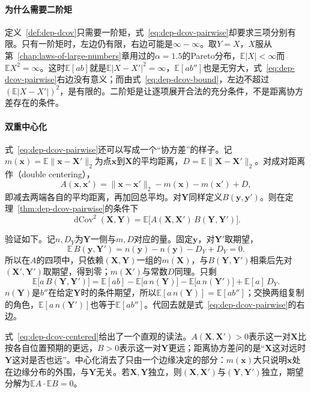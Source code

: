 \paragraph{为什么需要二阶矩}
定义~\ref{def:dep-dcov}只需要一阶矩，式~\eqref{eq:dep-dcov-pairwise}却要求三项分别有限。只有一阶矩时，左边仍有限，右边可能是$\infty-\infty$。取$Y=X$，$X$服从第~\ref{chap:laws-of-large-numbers}章用过的$\alpha=1.5$的Pareto分布，$\mathbb{E}\lvert X\rvert<\infty$而$\mathbb{E}X^{2}=\infty$。这时$\mathbb{E}[ab]$就是$\mathbb{E}\lvert X-X'\rvert^{2}=\infty$，$\mathbb{E}[ab'']$也是无穷大，式~\eqref{eq:dep-dcov-pairwise}右边没有意义；而由式~\eqref{eq:dep-dcov-bound}，左边不超过$(\mathbb{E}\lvert X-X'\rvert)^{2}$，是有限的。二阶矩是让逐项展开合法的充分条件，不是距离协方差存在的条件。

\paragraph{双重中心化}
式~\eqref{eq:dep-dcov-pairwise}还可以写成一个“协方差”的样子。记$m(\bm{x})=\mathbb{E}\lVert\bm{x}-\bm{X}'\rVert_2$为点$\bm{x}$到$\bm{X}$的平均距离，$D=\mathbb{E}\lVert\bm{X}-\bm{X}'\rVert_2$。对成对距离作（double centering），
\begin{equation}
  A(\bm{x},\bm{x}')=\lVert\bm{x}-\bm{x}'\rVert_2-m(\bm{x})-m(\bm{x}')+D ,
  \label{eq:dep-double-centering}
\end{equation}
即减去两端各自的平均距离，再加回总平均。对$\bm{Y}$同样定义$B(\bm{y},\bm{y}')$。则在定理~\ref{thm:dep-dcov-pairwise}的条件下
\begin{equation}
  \operatorname{dCov}^{2}(\bm{X},\bm{Y})=\mathbb{E}\bigl[A(\bm{X},\bm{X}')\,B(\bm{Y},\bm{Y}')\bigr].
  \label{eq:dep-dcov-centered}
\end{equation}

验证如下。记$n,D_Y$为$\bm{Y}$一侧与$m,D$对应的量。固定$\bm{y}$，对$\bm{Y}'$取期望，
\[
  \mathbb{E}\,B(\bm{y},\bm{Y}')=n(\bm{y})-n(\bm{y})-D_Y+D_Y=0 .
\]所以在$A$的四项中，只依赖$(\bm{X},\bm{Y})$一组的$m(\bm{X})$，与$B(\bm{Y},\bm{Y}')$相乘后先对$(\bm{X}',\bm{Y}')$取期望，得到零；$m(\bm{X}')$与常数$D$同理。只剩
\[
  \mathbb{E}\bigl[a\,B(\bm{Y},\bm{Y}')\bigr]=\mathbb{E}[ab]-\mathbb{E}\bigl[a\,n(\bm{Y})\bigr]-\mathbb{E}\bigl[a\,n(\bm{Y}')\bigr]+\mathbb{E}[a]\,D_Y .
\]
$n(\bm{Y})$是$b''$在给定$\bm{Y}$时的条件期望，所以$\mathbb{E}[a\,n(\bm{Y})]=\mathbb{E}[ab'']$；交换两组复制的角色，$\mathbb{E}[a\,n(\bm{Y}')]$也等于$\mathbb{E}[ab'']$。代回去就是式~\eqref{eq:dep-dcov-pairwise}的右边。

式~\eqref{eq:dep-dcov-centered}给出了一个直观的读法。$A(\bm{X},\bm{X}')>0$表示这一对$\bm{X}$比按各自位置预期的更远，$B>0$表示这一对$\bm{Y}$更远；距离协方差问的是“$\bm{X}$这对远时$\bm{Y}$这对是否也远”。中心化消去了只由一个边缘决定的部分：$m(\bm{x})$大只说明$\bm{x}$处在边缘分布的外围，与$\bm{Y}$无关。若$\bm{X},\bm{Y}$独立，则$(\bm{X},\bm{X}')$与$(\bm{Y},\bm{Y}')$独立，期望分解为$\mathbb{E}A\cdot\mathbb{E}B=0$。

